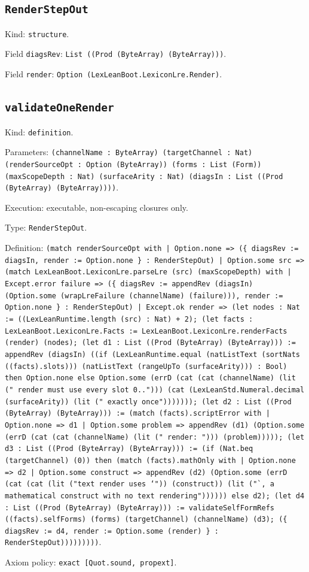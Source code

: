 \documentclass[11pt]{article}
\begin{document}
\subsection*{\texttt{RenderStepOut}}
\noindent Kind: \texttt{structure}.\par
\noindent Field \texttt{diagsRev}: \texttt{List ((Prod (ByteArray) (ByteArray)))}.\par
\noindent Field \texttt{render}: \texttt{Option (LexLeanBoot.LexiconLre.Render)}.\par
\subsection*{\texttt{validateOneRender}}
\noindent Kind: \texttt{definition}.\par
\noindent Parameters: \texttt{(channelName : ByteArray) (targetChannel : Nat) (renderSourceOpt : Option (ByteArray)) (forms : List (Form)) (maxScopeDepth : Nat) (surfaceArity : Nat) (diagsIn : List ((Prod (ByteArray) (ByteArray))))}.\par
\noindent Execution: executable, non-escaping closures only.\par
\noindent Type: \texttt{RenderStepOut}.\par
\noindent Definition: \texttt{(match renderSourceOpt with | Option.none => (\{ diagsRev := diagsIn, render := Option.none \} : RenderStepOut) | Option.some src => (match LexLeanBoot.LexiconLre.parseLre (src) (maxScopeDepth) with | Except.error failure => (\{ diagsRev := appendRev (diagsIn) (Option.some (wrapLreFailure (channelName) (failure))), render := Option.none \} : RenderStepOut) | Except.ok render => (let nodes : Nat := ((LexLeanRuntime.length (src) : Nat) + 2); (let facts : LexLeanBoot.LexiconLre.Facts := LexLeanBoot.LexiconLre.renderFacts (render) (nodes); (let d1 : List ((Prod (ByteArray) (ByteArray))) := appendRev (diagsIn) ((if (LexLeanRuntime.equal (natListText (sortNats ((facts).slots))) (natListText (rangeUpTo (surfaceArity))) : Bool) then Option.none else Option.some (errD (cat (cat (channelName) (lit (" render must use every slot 0.."))) (cat (LexLeanStd.Numeral.decimal (surfaceArity)) (lit (" exactly once"))))))); (let d2 : List ((Prod (ByteArray) (ByteArray))) := (match (facts).scriptError with | Option.none => d1 | Option.some problem => appendRev (d1) (Option.some (errD (cat (cat (channelName) (lit (" render: "))) (problem))))); (let d3 : List ((Prod (ByteArray) (ByteArray))) := (if (Nat.beq (targetChannel) (0)) then (match (facts).mathOnly with | Option.none => d2 | Option.some construct => appendRev (d2) (Option.some (errD (cat (cat (lit ("text render uses `")) (construct)) (lit ("`, a mathematical construct with no text rendering")))))) else d2); (let d4 : List ((Prod (ByteArray) (ByteArray))) := validateSelfFormRefs ((facts).selfForms) (forms) (targetChannel) (channelName) (d3); (\{ diagsRev := d4, render := Option.some (render) \} : RenderStepOut)))))))))}.\par
\noindent Axiom policy: \texttt{exact [Quot.sound, propext]}.\par
\end{document}
